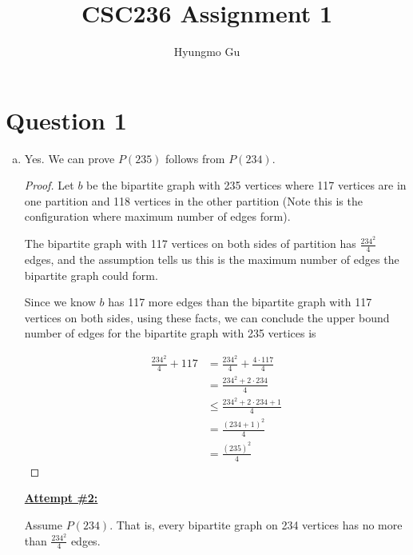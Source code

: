 \documentclass[12pt]{article}
\begin{document}
\title{CSC236 Assignment 1}
\author{Hyungmo Gu}
\maketitle

\section*{Question 1}
\begin{enumerate}[a.]
    \item

    Yes. We can prove $P(235)$ follows from $P(234)$.

    \bigskip

    \begin{proof}
    Let $b$ be the bipartite graph with 235 vertices where
    117 vertices are in one partition and 118 vertices in
    the other partition (Note this is the configuration where maximum number of edges form).

    \bigskip

    The bipartite graph with 117 vertices on both sides of partition has
    $\frac{234^2}{4}$ edges, and the assumption tells us this is the maximum number of edges the
    bipartite graph could form.

    \bigskip

    Since we know $b$ has 117 more edges than the bipartite graph with 117 vertices on
    both sides, using these facts, we can conclude the upper bound number of edges for the bipartite
    graph with 235 vertices is

    \begin{align}
        \frac{234^2}{4} + 117 &= \frac{234^2}{4} + \frac{4 \cdot 117}{4}\\
        &= \frac{234^2 + 2 \cdot 234}{4}\\
        &\leq \frac{234^2 + 2 \cdot 234 + 1}{4}\\
        &= \frac{(234+1)^2}{4}\\
        &= \frac{(235)^2}{4}
    \end{align}

    \end{proof}

    \bigskip

    \begin{mdframed}
        \underline{\textbf{Attempt \#2:}}

        \bigskip

        Assume $P(234)$. That is, every bipartite graph on 234 vertices has no more
        than $\frac{234^2}{4}$ edges.


\end{mdframed}
\end{enumerate}
\end{document}
